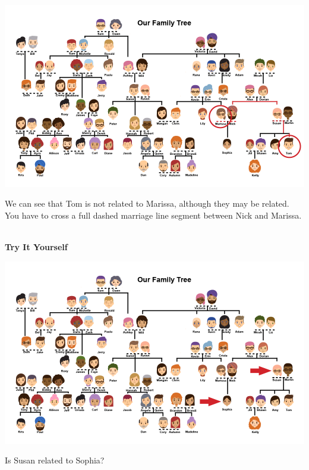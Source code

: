 \documentclass{ximera}
\begin{document}
\begin{example}
\quad \\

\begin{image}
\includegraphics{pics/Marissa_Tom.png}
\end{image}

We can see that Tom is not related to Marissa, although they may be related.  You have to cross a full dashed marriage line segment between Nick and Marissa.

\end{example}



\begin{example}
\quad \\
\textbf{Try It Yourself}

\begin{image}
\includegraphics{pics/Sophia_Susan_arrow.png}
\end{image}

Is Susan related to Sophia?
\begin{multipleChoice}
\end{multipleChoice}

\end{example}
\end{document}
